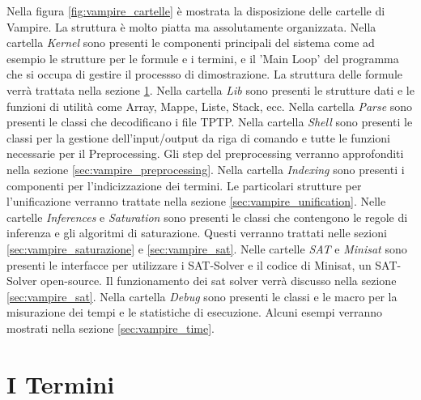 \documentclass[./main.tex]{subfiles}
\begin{document}
Nella figura \ref{fig:vampire_cartelle} è mostrata la disposizione delle cartelle di Vampire.
La struttura è molto piatta ma assolutamente organizzata.
Nella cartella \textit{Kernel} sono presenti le componenti principali del sistema come ad esempio le strutture per le formule e i termini,
e il 'Main Loop' del programma che si occupa di gestire il processso di dimostrazione.
La struttura delle formule verrà trattata nella sezione \ref{sec:vampire_term}.
Nella cartella \textit{Lib} sono presenti le strutture dati e le funzioni di utilità come Array, Mappe, Liste, Stack, ecc.
Nella cartella \textit{Parse} sono presenti le classi che decodificano 
i file TPTP. 
Nella cartella \textit{Shell} sono presenti le classi per la gestione dell'input/output da riga di comando
e tutte le funzioni necessarie per il Preprocessing.
Gli step del preprocessing verranno approfonditi nella sezione \ref{sec:vampire_preprocessing}.
Nella cartella \textit{Indexing} sono presenti i componenti per l'indicizzazione dei termini.
Le particolari strutture per l'unificazione verranno trattate nella sezione \ref{sec:vampire_unification}.
Nelle cartelle \textit{Inferences} e \textit{Saturation} sono presenti le classi che contengono le regole di inferenza
e gli algoritmi di saturazione. Questi verranno trattati nelle sezioni \ref{sec:vampire_saturazione} e \ref{sec:vampire_sat}.
Nelle cartelle \textit{SAT} e \textit{Minisat} sono presenti le interfacce per utilizzare i SAT-Solver e
il codice di Minisat, un SAT-Solver open-source. 
Il funzionamento dei sat solver verrà discusso nella sezione \ref{sec:vampire_sat}.
Nella cartella \textit{Debug} sono presenti le classi e le macro per la misurazione dei tempi e le statistiche di esecuzione.
Alcuni esempi verranno mostrati nella sezione \ref{sec:vampire_time}.


\section{I Termini} \label{sec:vampire_term}
\end{document}
